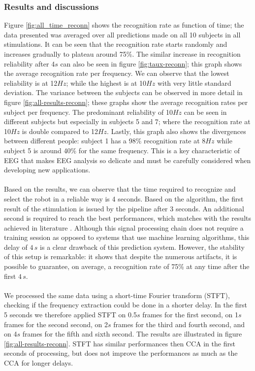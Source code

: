 \documentclass[smallextended]{svjour3}
\begin{document}
\subsubsection{Results and discussions}
Figure \ref{fig:all_time_reconn} shows the recognition rate as function of time; the data presented was averaged over all predictions made on all 10 subjects in all stimulations. It can be seen that the recognition rate starts randomly and increases gradually to plateau around 75\%. The similar increase in recognition reliability after 4$s$ can also be seen in figure \ref{fig:taux-reconn}; this graph shows the average recognition rate per frequency. We can observe that the lowest reliability is at 12$Hz$; while the highest is at 10$Hz$ with very little standard deviation. The variance between the subjects can be observed in more detail in figure \ref{fig:all-results-reconn}; these graphs show the average recognition rates per subject per frequency. The predominant reliability of 10$Hz$ can be seen in different subjects but especially in subjects 5 and 7; where the recognition rate at 10$Hz$ is double compared to 12$Hz$. Lastly, this graph also shows the divergences between different people: subject 1 has a 98\% recognition rate at 8$Hz$ while subject 5 is around 40\% for the same frequency. This is a key characteristic of EEG that makes EEG analysis so delicate and must be carefully considered when developing new applications.\\
\\
Based on the results, we can observe that the time required to recognize and select the robot in a reliable way is 4 seconds. 
Based on the algorithm, the first result of the stimulation is issued by the pipeline after 3 seconds. 
An additional second is required to reach the best performances, which matches with the results achieved in literature \cite{car,SSVEPfiability,jian2014improving,paper4}. 
Although this signal processing chain does not require a training session as opposed to systems that use machine learning algorithms, this delay of $4\,s$ is a clear drawback of this prediction system. 
However, the stability of this setup is remarkable: it shows that despite the numerous artifacts, it is possible to guarantee, on average, a recognition rate of 75\% at any time after the first $4\,s$. \\
\\
We processed the same data using a short-time Fourier transform (STFT), checking if the frequency extraction could be done in a shorter delay. 
In the first 5 seconds we therefore applied STFT on 0.5$s$ frames for the first second, on 1$s$ frames for the second second, on 2$s$ frames for the third and fourth second, and on 4$s$ frames for the fifth and sixth second. The results are illustrated in figure \ref{fig:all-results-reconn}. STFT has similar performances then CCA in the first seconds of processing, but does not improve the performances as much as the CCA for longer delays.\\
\end{document}
